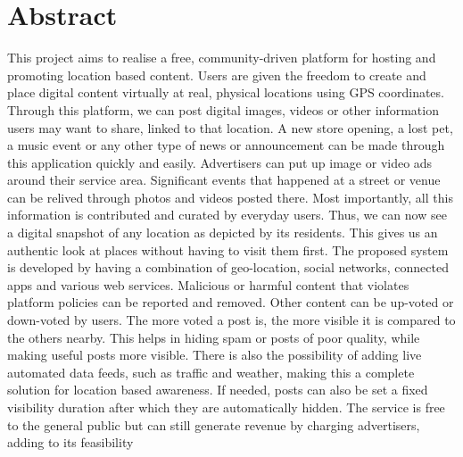 \chapter*{Abstract}
\begin{spacing}{1.5}
This project aims to realise a free, community-driven platform for hosting and
promoting location based content. Users are given the freedom to create and place
digital content virtually at real, physical locations using GPS coordinates.
Through this platform, we can post digital images, videos or other information
users may want to share, linked to that location.
A new store opening, a lost pet, a music event or any other type of news or
announcement can be made through this application quickly and easily.
Advertisers can put up image or video ads around their service area. Significant
events that happened at a street or venue can be relived through photos and videos
posted there. Most importantly, all this information is contributed and curated by
everyday users. Thus, we can now see a digital snapshot of any location as
depicted by its residents. This gives us an authentic look at places without having
to visit them first.
The proposed system is developed by having a combination of geo-location,
social networks, connected apps and various web services. Malicious or harmful
content that violates platform policies can be reported and removed. Other
content can be up-voted or down-voted by users. The more voted a post is, the
more visible it is compared to the others nearby. This helps in hiding spam or
posts of poor quality, while making useful posts more visible. There is also the
possibility of adding live automated data feeds, such as traffic and weather,
making this a complete solution for location based awareness. If needed, posts
can also be set a fixed visibility duration after which they are automatically
hidden. The service is free to the general public but can still generate revenue by
charging advertisers, adding to its feasibility
\paragraph{}

\end{spacing}

